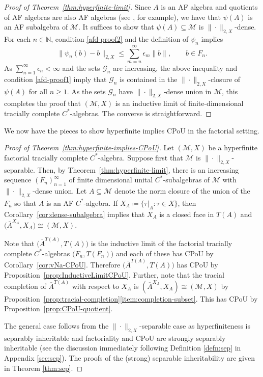 \documentclass[a4paper,11pt]{amsart}
\theoremstyle{definition}
\numberwithin{equation}{section}
\numberwithin{theorem}{section}
\newcommand{\M}{\mathcal{M}}
\newcommand{\completion}[2]{\overline{#1}^{#2}}
\begin{document}
\begin{proof}[Proof of Theorem~\ref{thm:hyperfinite-limit}]
	Since $A$ is an AF algebra and quotients of AF algebras are also AF algebras (see \cite[Theorem III.4.4]{Davidson96}, for example), we have that $\psi(A)$ is an AF subalgebra of $\mathcal M$.  It suffices to show that $\psi(A) \subseteq \mathcal M$ is $\|\cdot\|_{2, X}$-dense.  For each $n \in \mathbb N$, condition \ref{afd-proof2} and the definition of $\psi_n$ implies
	\begin{equation}
		\|\psi_n(b) - b \|_{2, X} \leq \sum_{m=n}^\infty \epsilon_m \|b\|, \qquad  b \in F_n. 
	\end{equation}
	As $\sum_{n=1}^\infty \epsilon_n < \infty$ and the sets $\mathcal G_n$ are increasing, the above inequality and condition \ref{afd-proof1} imply that $\mathcal G_n$ is contained in the $\|\cdot\|_{2, X}$-closure of $\psi(A)$ for all $n \geq 1$.  As the sets $\mathcal G_n$ have $\|\cdot\|_{2, X}$-dense union in $\mathcal M$, this completes the proof that $(\M,X)$ is an inductive limit of finite-dimensional tracially complete $C^*$-algebras. The converse is straightforward.
\end{proof}

We now have the pieces to show hyperfinite implies CPoU in the factorial setting.

\begin{proof}[Proof of Theorem~\ref{thm:hyperfinite-implies-CPoU}]
	Let $(\mathcal M, X)$ be a hyperfinite factorial tracially complete $C^*$-algebra. Suppose first that $\M$ is $\|\cdot\|_{2,X}$-separable.  Then, by Theorem~\ref{thm:hyperfinite-limit}, there is an increasing sequence $(F_n)_{n=1}^\infty$ of finite dimensional unital $C^*$-subalgebras of $\mathcal M$ with $\|\cdot\|_{2, X}$-dense union.  Let $A \subseteq \mathcal M$ denote the norm closure of the union of the $F_n$ so that $A$ is an AF $C^*$-algebra.  If $X_A \coloneqq \{\tau|_A : \tau \in X \}$, then Corollary~\ref{cor:dense-subalgebra} implies that $X_A$ is a closed face in $T(A)$ and $\big(\completion{A}{X_A}, X_A\big) \cong (\mathcal M, X)$.  

Note that $\big(\completion{A}{T(A)},T(A)\big)$ is the inductive limit of the factorial tracially complete $C^*$-algebras $\big(F_n, T(F_n)\big)$ and each of these has CPoU by Corollary~\ref{cor:vNa-CPoU}. Therefore $\big(\completion{A}{T(A)},T(A)\big)$ has CPoU by Proposition~\ref{prop:InductiveLimitCPoU}.  Further, note that the tracial completion of $\completion{A}{T(A)}$ with respect to $X_A$ is $(\completion{A}{X_A},X_A)\cong (\M,X)$ by Proposition~\ref{prop:tracial-completion}\ref{item:completion-subset}. This has CPoU by Proposition~\ref{prop:CPoU-quotient}.

The general case follows from the $\|\cdot\|_{2,X}$-separable case as hyperfiniteness is separably inheritable and factoriality and CPoU are strongly separably inheritable (see the discussion immediately following Definition \ref{defn:sep} in Appendix \ref{sec:sep}).  The proofs of the (strong) separable inheritability are given in Theorem \ref{thm:sep}.
\end{proof}
\end{document}
